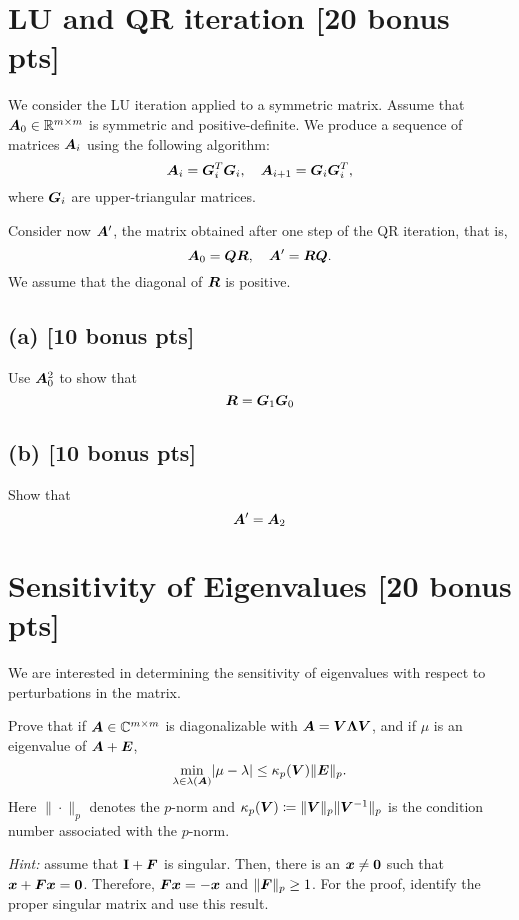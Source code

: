 \documentclass[twoside,10pt]{article}
\begin{document}
\section{LU and QR iteration [20 bonus pts]}
We consider the LU iteration applied to a symmetric matrix. Assume that $\bm{A}_0 \in \mathbb{R}^{m \times m}$ is symmetric and positive-definite. 
We produce a sequence of matrices $\bm{A}_i$ using the following algorithm:
\begin{equation}
  \bm{A}_i = \bm{G}^T_i \bm{G}_i, \quad \bm{A}_{i + 1} = \bm{G}_i \bm{G}_i^T, 
\end{equation}
where $\bm{G}_i$ are upper-triangular matrices.

Consider now $\bm{A}'$, the matrix obtained after one step of the QR iteration, that is, 
\begin{equation}
  \bm{A}_0 = \bm{Q}\bm{R}, \quad \bm{A}' = \bm{R} \bm{Q}.
\end{equation}
We assume that the diagonal of $\bm{R}$ is positive.

\subsection*{(a) [10 bonus pts]}
Use $\bm{A}_0^2$ to show that 
\begin{equation}
  \bm{R} = \bm{G}_1 \bm{G}_0
\end{equation}

\subsection*{(b) [10 bonus pts]}
Show that
\begin{equation}
  \bm{A}' = \bm{A}_2
\end{equation}
   
\section{Sensitivity of Eigenvalues [20 bonus pts]}
We are interested in determining the sensitivity of eigenvalues with respect to perturbations in the matrix.

Prove that if $\bm{A} \in \mathbb{C}^{m \times m}$ is diagonalizable with $\bm{A} = \bm{V} \bm{\Lambda} \bm{V}$, and if $\mu$ is an eigenvalue of $\bm{A} + \bm{E}$, 
\begin{equation}
  \min \limits_{\lambda \in \lambda(\mtx{A})}  \left|\mu -\lambda \right| \leq \kappa_p(\mtx{V}) \|\mtx{E}\|_p.
\end{equation}
Here $\|\cdot\|_p$ denotes the $p$-norm and $\kappa_p(\bm{V}) \coloneqq \|\bm{V}\|_p \|\bm{V}^{-1}\|_p$ is the condition number associated with the $p$-norm. 

\emph{Hint:} assume that $\mathbf{I} + \bm{F}$ is singular. Then, there is an $\bm{x} \neq \bm{0}$ such that $\bm{x} + \bm{F}\bm{x} = \bm{0}$. Therefore, $\bm{F} \bm{x} = -\bm{x}$ and $\|\bm{F}\|_{p} \geq 1$. 
For the proof, identify the proper singular matrix and use this result. 
\end{document}
